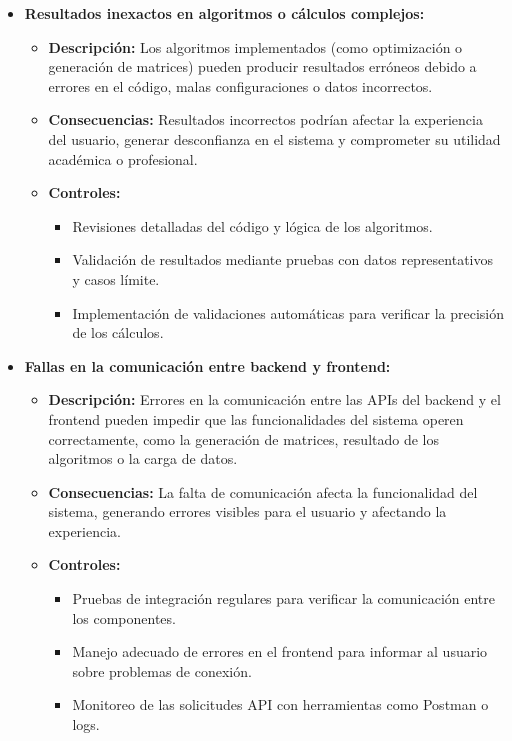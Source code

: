 \documentclass[stu, 12pt, letterpaper, donotrepeattitle, floatsintext, natbib]{apa7}
\begin{document}
\begin{itemize}
    \item \textbf{Resultados inexactos en algoritmos o cálculos complejos:} 
    \begin{itemize}
        \item \textbf{Descripción:} Los algoritmos implementados (como optimización o generación de matrices) pueden producir resultados erróneos debido a errores en el código, malas configuraciones o datos incorrectos.
        \item \textbf{Consecuencias:} Resultados incorrectos podrían afectar la experiencia del usuario, generar desconfianza en el sistema y comprometer su utilidad académica o profesional.
        \item \textbf{Controles:} 
        \begin{itemize}
            \item Revisiones detalladas del código y lógica de los algoritmos.
            \item Validación de resultados mediante pruebas con datos representativos y casos límite.
            \item Implementación de validaciones automáticas para verificar la precisión de los cálculos.
        \end{itemize}
    \end{itemize}

    \item \textbf{Fallas en la comunicación entre backend y frontend:} 
    \begin{itemize}
        \item \textbf{Descripción:} Errores en la comunicación entre las APIs del backend y el frontend pueden impedir que las funcionalidades del sistema operen correctamente, como la generación de matrices, resultado de los algoritmos o la carga de datos.
        \item \textbf{Consecuencias:} La falta de comunicación afecta la funcionalidad del sistema, generando errores visibles para el usuario y afectando la experiencia.
        \item \textbf{Controles:} 
        \begin{itemize}
            \item Pruebas de integración regulares para verificar la comunicación entre los componentes.
            \item Manejo adecuado de errores en el frontend para informar al usuario sobre problemas de conexión.
            \item Monitoreo de las solicitudes API con herramientas como Postman o logs.
        \end{itemize}
    \end{itemize}


\end{itemize}
\end{document}
